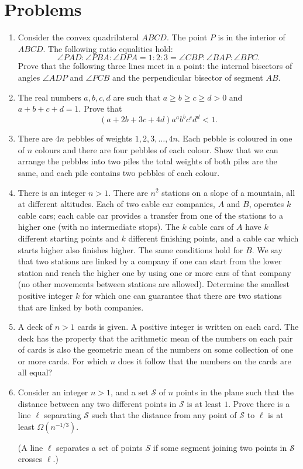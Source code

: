 \documentclass[11pt]{scrartcl}
\begin{document}
\section{Problems}
\begin{enumerate}[\bfseries 1.]
\item %
Consider the convex quadrilateral $ABCD$.
The point $P$ is in the interior of $ABCD$.
The following ratio equalities hold:
\[\angle PAD:\angle PBA:\angle DPA
  = 1:2:3
  = \angle CBP:\angle BAP:\angle BPC.\]
Prove that the following three lines meet in a point:
the internal bisectors of angles $\angle ADP$ and $\angle PCB$
and the perpendicular bisector of segment $AB$.

\item %
The real numbers $a, b, c, d$
are such that $a\geq b\geq c\geq d>0$ and $a+b+c+d=1$.
Prove that
\[ (a+2b+3c+4d) a^a b^b c^c d^d < 1. \]

\item %
There are $4n$ pebbles of weights $1, 2, 3, \dots, 4n$.
Each pebble is coloured in one of $n$ colours
and there are four pebbles of each colour.
Show that we can arrange the pebbles into two piles
the total weights of both piles are the same,
and each pile contains two pebbles of each colour.

\item %
There is an integer $n > 1$.
There are $n^2$ stations on a slope of a mountain, all at different altitudes.
Each of two cable car companies, $A$ and $B$, operates $k$ cable cars;
each cable car provides a transfer from one of the stations
to a higher one (with no intermediate stops).
The $k$ cable cars of $A$ have $k$ different starting points
and $k$ different finishing points, and a cable car which starts higher also finishes higher.
The same conditions hold for $B$.
We say that two stations are linked by a company if one can start from the lower station
and reach the higher one by using one or more cars of that company
(no other movements between stations are allowed).
Determine the smallest positive integer $k$ for which one can guarantee
that there are two stations that are linked by both companies.

\item %
A deck of $n > 1$ cards is given.
A positive integer is written on each card.
The deck has the property that the arithmetic mean of the
numbers on each pair of cards is also the
geometric mean of the numbers on some collection of one or more cards.
For which $n$ does it follow that the numbers on the cards are all equal?

\item %
Consider an integer $n > 1$, and a set $\mathcal S$ of $n$ points
in the plane such that the distance between any two different points
in $\mathcal S$ is at least $1$.
Prove there is a line $\ell$ separating $\mathcal S$
such that the distance from any point of $\mathcal S$ to $\ell$
is at least $\Omega(n^{-1/3})$.

(A line $\ell$ separates a set of points $S$
if some segment joining two points in $\mathcal S$ crosses $\ell$.)

\end{enumerate}
\pagebreak
\end{document}
